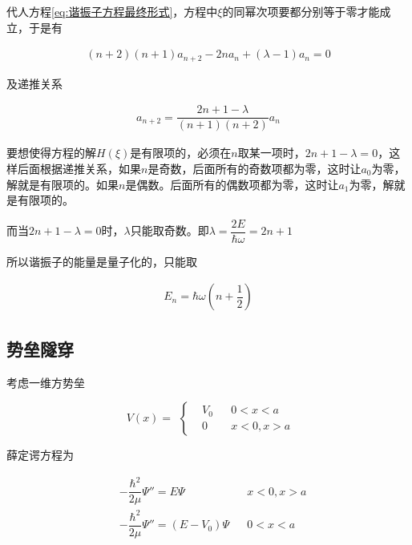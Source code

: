 代人方程\ref{eq:谐振子方程最终形式}，方程中$\xi$的同幂次项要都分别等于零才能成立，于是有

\begin{equation*}
  \begin{aligned}
    \left( n + 2 \right) \left( n + 1 \right) a_{n+2} - 2 n a_n + \left( \lambda - 1 \right) a_n = 0
  \end{aligned}
\end{equation*}

及递推关系

\begin{equation*}
  \begin{aligned}
    a_{n+2} = \dfrac{2 n + 1 - \lambda}{\left( n + 1 \right) \left( n + 2 \right)} a_n 
  \end{aligned}
\end{equation*}

要想使得方程的解$H \left( \xi \right)$是有限项的，必须在$n$取某一项时，$2n+1- \lambda = 0$，这样后面根据递推关系，如果$n$是奇数，后面所有的奇数项都为零，这时让$a_0$为零，解就是有限项的。如果$n$是偶数。后面所有的偶数项都为零，这时让$a_1$为零，解就是有限项的。

而当$2n+1- \lambda = 0$时，$\lambda$只能取奇数。即$\lambda = \dfrac{2E}{\hbar \omega} = 2 n + 1 $

所以谐振子的能量是量子化的，只能取

\begin{equation*}
  \begin{aligned}
    E_n = \hbar \omega \left( n + \dfrac{1}{2}  \right)
  \end{aligned}
\end{equation*}

\subsection{势垒隧穿}

考虑一维方势垒

\begin{equation*}
  \begin{aligned}
    V \left( x \right) = 
  \end{aligned}
  \left\{
  \begin{aligned}
    &V_0&&0<x<a \\
    &0&&x<0,x>a
  \end{aligned}
  \right.
\end{equation*}

薛定谔方程为

\begin{equation*}
  \begin{aligned}
    & - \dfrac{\hbar^2}{2 \mu} \Psi'' = E \Psi && x<0,x>a \\
    & - \dfrac{\hbar^2}{2 \mu} \Psi'' = \left( E - V_0 \right) \Psi && 0<x<a
  \end{aligned}
\end{equation*}

